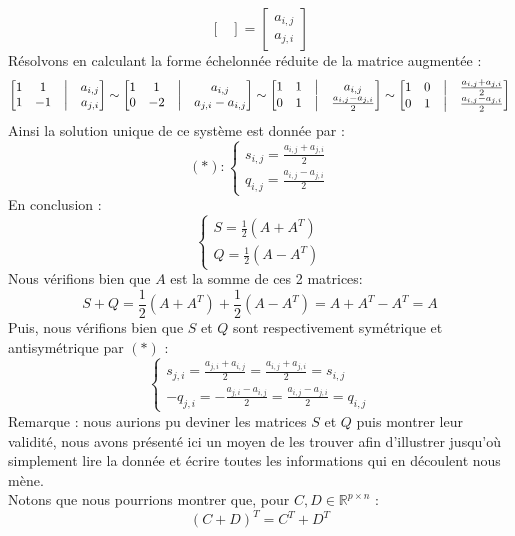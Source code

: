 \documentclass{article}
\newcommand{\R}{\mathbb{R}}
\newcommand{\cross}{\times}
\begin{document}
\begin{enumerate}
$$\begin{bmatrix}
    \end{bmatrix}=\begin{bmatrix}
    a_{i,j} \\ a_{j,i}
    \end{bmatrix}
    $$
    Résolvons en calculant la forme échelonnée réduite de la matrice augmentée :
    $$
    \begin{bmatrix}
    1 & 1 & \bigm| & a_{i,j}\\
    1 & -1 & \bigm| & a_{j,i}
    \end{bmatrix} \sim
    \begin{bmatrix}
    1 & 1 & \bigm| & a_{i,j}\\
    0 & -2 & \bigm| & a_{j,i} - a_{i,j}
    \end{bmatrix}\sim
    \begin{bmatrix}
    1 & 1 & \bigm| & a_{i,j}\\
    0 & 1 & \bigm| & \frac{a_{i,j} - a_{j,i}}{2}
    \end{bmatrix}\sim
    \begin{bmatrix}
    1 & 0 & \bigm| &\frac{a_{i,j} + a_{j,i}}{2}\\
    0 & 1 & \bigm| & \frac{a_{i,j} - a_{j,i}}{2}
    \end{bmatrix}
    $$
    Ainsi la solution unique de ce système est donnée par :
    $$
    (*) : \begin{cases}
    s_{i,j} = \frac{a_{i,j} + a_{j,i}}{2}\\
    q_{i,j} = \frac{a_{i,j} - a_{j,i}}{2}
    \end{cases}
    $$
    En conclusion :
    $$
    \begin{cases}
    S = \frac{1}{2}(A + A^T)\\
    Q = \frac{1}{2}(A - A^T)
    \end{cases}
    $$
    Nous vérifions bien que $A$ est la somme de ces 2 matrices:
    $$
    S + Q = \frac{1}{2}(A + A^T) + \frac{1}{2}(A - A^T) = A + A^T - A^T = A
    $$
    Puis, nous vérifions bien que $S$ et $Q$ sont respectivement symétrique et antisymétrique par $(*)$ : 
    $$
    \begin{cases}
    s_{j,i} = \frac{a_{j,i}+a_{i,j}}{2} = \frac{a_{i,j} + a_{j,i}}{2} = s_{i,j}\\
    -q_{j,i} = -\frac{a_{j,i} - a_{i,j}}{2} = \frac{a_{i,j} - a_{j,i}}{2} = q_{i,j}
    \end{cases}
    $$
    Remarque : nous aurions pu deviner les matrices $S$ et $Q$ puis montrer leur validité, nous avons présenté ici un moyen de les trouver afin d'illustrer jusqu'où simplement lire la donnée et écrire toutes les informations qui en découlent nous mène.\\
    
    \noindent Notons que nous pourrions montrer que, pour $C, D \in \R^{p \cross n}$ :
    $$(C + D)^T = C^T + D^T
    $$
\end{enumerate}
\end{document}
